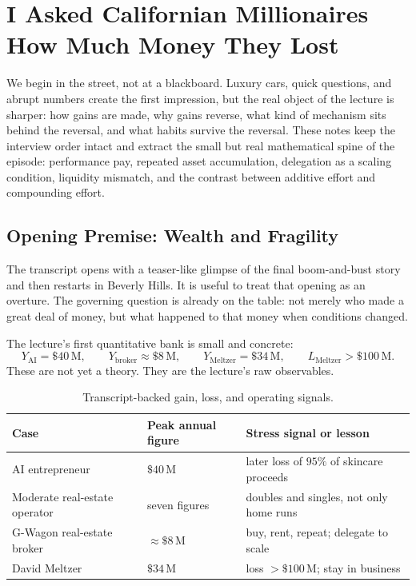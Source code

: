 \chapter{I Asked Californian Millionaires How Much Money They Lost}

We begin in the street, not at a blackboard. Luxury cars, quick questions, and abrupt numbers create the first impression, but the real object of the lecture is sharper: how gains are made, why gains reverse, what kind of mechanism sits behind the reversal, and what habits survive the reversal. These notes keep the interview order intact and extract the small but real mathematical spine of the episode: performance pay, repeated asset accumulation, delegation as a scaling condition, liquidity mismatch, and the contrast between additive effort and compounding effort.

\section{Opening Premise: Wealth and Fragility}

The transcript opens with a teaser-like glimpse of the final boom-and-bust story and then restarts in Beverly Hills. It is useful to treat that opening as an overture. The governing question is already on the table: not merely who made a great deal of money, but what happened to that money when conditions changed.

The lecture's first quantitative bank is small and concrete:
\begin{equation}
Y_{\mathrm{AI}}=\$40\,\mathrm{M},\qquad
Y_{\mathrm{broker}}\approx \$8\,\mathrm{M},\qquad
Y_{\mathrm{Meltzer}}=\$34\,\mathrm{M},\qquad
L_{\mathrm{Meltzer}}>\$100\,\mathrm{M}.
\end{equation}
These are not yet a theory. They are the lecture's raw observables.

\begin{table}[h]
\centering
\begin{tabular}{lll}
\hline
Case & Peak annual figure & Stress signal or lesson \\
\hline
AI entrepreneur & \(\$40\,\mathrm{M}\) & later loss of \(95\%\) of skincare proceeds \\
Moderate real-estate operator & seven figures & doubles and singles, not only home runs \\
G-Wagon real-estate broker & \(\approx \$8\,\mathrm{M}\) & buy, rent, repeat; delegate to scale \\
David Meltzer & \(\$34\,\mathrm{M}\) & loss \(>\$100\,\mathrm{M}\); stay in business \\
\hline
\end{tabular}
\caption{Transcript-backed gain, loss, and operating signals.}
\end{table}

